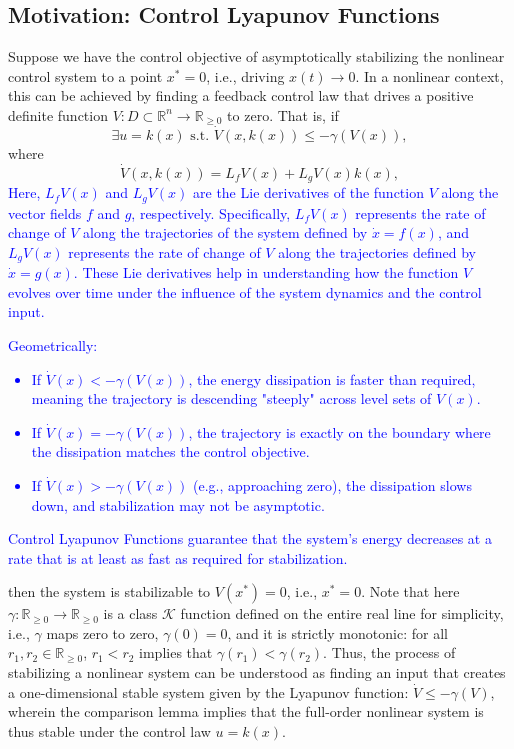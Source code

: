\documentclass[12pt]{article}
\begin{document}
\subsection{Motivation: Control Lyapunov Functions}
Suppose we have the control objective of asymptotically stabilizing the nonlinear control system to a point \( x^* = 0 \), i.e., driving \( x(t) \to 0 \). In a nonlinear context, this can be achieved by finding a feedback control law that drives a positive definite function \( V : D \subset \mathbb{R}^n \to \mathbb{R}_{\geq 0} \) to zero. That is, if
\[
\exists u = k(x) \text{ s.t. } \dot{V}(x, k(x)) \leq -\gamma(V(x)),
\]
where
\[
\dot{V}(x, k(x)) = L_f V(x) + L_g V(x) k(x),
\]
\textcolor{blue}{Here, \( L_f V(x) \) and \( L_g V(x) \) are the Lie derivatives of the function \( V \) along the vector fields \( f \) and \( g \), respectively. Specifically, \( L_f V(x) \) represents the rate of change of \( V \) along the trajectories of the system defined by \( \dot{x} = f(x) \), and \( L_g V(x) \) represents the rate of change of \( V \) along the trajectories defined by \( \dot{x} = g(x) \). These Lie derivatives help in understanding how the function \( V \) evolves over time under the influence of the system dynamics and the control input.}

\textcolor{blue}{
Geometrically:
\begin{itemize}
    \item If \(\dot{V}(x) < -\gamma(V(x))\), the energy dissipation is faster than required, meaning the trajectory is descending "steeply" across level sets of \(V(x)\).
    \item If \(\dot{V}(x) = -\gamma(V(x))\), the trajectory is exactly on the boundary where the dissipation matches the control objective.
    \item If \(\dot{V}(x) > -\gamma(V(x))\) (e.g., approaching zero), the dissipation slows down, and stabilization may not be asymptotic.
\end{itemize}
Control Lyapunov Functions guarantee that the system's energy decreases at a rate that is at least as fast as required for stabilization.
}

then the system is stabilizable to \( V(x^*) = 0 \), i.e., \( x^* = 0 \). Note that here \( \gamma : \mathbb{R}_{\geq 0} \to \mathbb{R}_{\geq 0} \) is a class \( \mathcal{K} \) function defined on the entire real line for simplicity, i.e., \( \gamma \) maps zero to zero, \( \gamma(0) = 0 \), and it is strictly monotonic: for all \( r_1, r_2 \in \mathbb{R}_{\geq 0} \), \( r_1 < r_2 \) implies that \( \gamma(r_1) < \gamma(r_2) \). Thus, the process of stabilizing a nonlinear system can be understood as finding an input that creates a one-dimensional stable system given by the Lyapunov function: \( \dot{V} \leq -\gamma(V) \), wherein the comparison lemma implies that the full-order nonlinear system is thus stable under the control law \( u = k(x) \).
\end{document}
